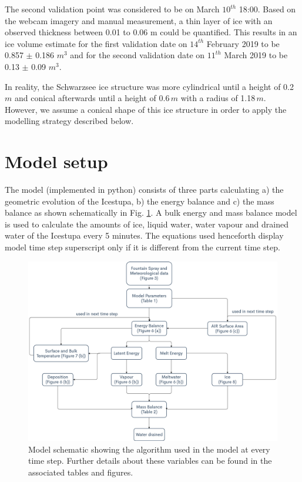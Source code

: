 \documentclass[utf8]{frontiersSCNS} %
\begin{document}
The second validation point was considered to be on March $10^{th}$ 18:00.
Based on the webcam imagery and manual measurement, a thin layer of ice with
an observed thickness between 0.01 to 0.06 m could be quantified. This results
in an ice volume estimate for the first validation date on $14^{th}$ February
2019 to be 0.857 $\pm$ 0.186 $m^{3}$ and for the second validation date on
$11^{th}$ March 2019 to be 0.13 $\pm$ 0.09 $m^{3}$.

In reality, the Schwarzsee ice structure was more cylindrical until a height
of 0.2\,$m$ and conical afterwards until a height of 0.6\,$m$ with a radius of
1.18\,$m$. However, we assume a conical shape of this ice structure in order
to apply the modelling strategy described below.

\section{Model setup}

The model (implemented in python) consists of three parts calculating a) the
geometric evolution of the Icestupa, b) the energy balance and c) the mass
balance as shown schematically in Fig. \ref{fig:schema}. A bulk energy and
mass balance model is used to calculate the amounts of ice, liquid water,
water vapour and drained water of the Icestupa every 5 minutes. The equations
used henceforth display model time step superscript only if it is different
from the current time step.

  \begin{figure}
    \begin{center} 
      \includegraphics[width=15 cm]{Figures/Figure_4.jpg} 
    \end{center} 
    \caption{Model schematic showing the algorithm used in the model at every time step. Further details about these
variables can be found in the associated tables and figures.}
\label{fig:schema} 
\end{figure}
  
\end{document}
